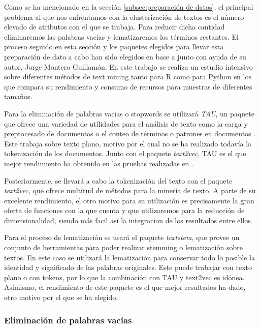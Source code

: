 \documentclass[10pt, a4paper]{article}
\begin{document}
Como se ha mencionado en la sección \ref{subsec:preparación de datos}, el principal problema al que nos enfrentamos con la clusterización de textos es el número elevado de atributos con el que se trabaja. Para reducir dicha cantidad eliminaremos las palabras vacías y lematizaremos los términos restantes. El proceso seguido en esta sección y los paquetes elegidos para llevar esta preparación de dato a cabo han sido elegidos en base a \cite{TFG Jorge} junto con ayuda de su autor, Jorge Montero Guillamón. En este trabajo se realiza un estudio intensivo sobre diferentes métodos de text mining tanto para R como para Python en los que compara su rendimiento y consumo de recursos para muestras de diferentes tamaños.

Para la eliminación de palabras vacías o stopwords se utilizará \textit{TAU}, un paquete que ofrece una variedad de utilidades para el análisis de texto como la carga y preprocesado de documentos o el conteo de términos o patrones en documentos \cite{TFG Jorge}. Este trabaja sobre texto plano, motivo por el cual no se ha realizado todavía la tokenización de los documentos. Junto con el paquete \textit{text2vec}, TAU es el que mejor rendimiento ha obtenido en las pruebas realizadas en \cite{TFG Jorge}.

Posteriormente, se llevará a cabo la tokenización del texto con el paquete \textit{text2vec}, que ofrece multitud de métodos para la minería de texto. A parte de su excelente rendimiento, el otro motivo para su utilización es precisamente la gran oferta de funciones con la que cuenta y que utilizaremos para la reducción de dimensionalidad, siendo más facil así la integracion de los resultados entre ellos.

Para el proceso de lematización se usará el paquete \textit{textstem}, que provee un conjunto de herramientas para poder realizar stemming o lematización sobre textos. En este caso se utilizará la lematización para conservar todo lo posible la identidad y significado de las palabras originales. Este puede trabajar con texto plano o con tokens, por lo que la combinación con TAU y text2vec es idónea. Asimismo, el rendimiento de este paquete es el que mejor resultados ha dado, otro motivo por el que se ha elegido.

\subsubsection{Eliminación de palabras vacías}
\end{document}
